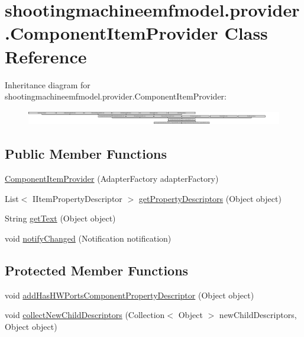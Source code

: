 \hypertarget{classshootingmachineemfmodel_1_1provider_1_1_component_item_provider}{\section{shootingmachineemfmodel.\-provider.\-Component\-Item\-Provider Class Reference}
\label{classshootingmachineemfmodel_1_1provider_1_1_component_item_provider}
}
Inheritance diagram for shootingmachineemfmodel.\-provider.\-Component\-Item\-Provider\-:\begin{figure}[H]
\begin{center}
\leavevmode
\includegraphics[height=0.649840cm]{classshootingmachineemfmodel_1_1provider_1_1_component_item_provider}
\end{center}
\end{figure}
\subsection*{Public Member Functions}
\begin{DoxyCompactItemize}
\item 
\hyperlink{classshootingmachineemfmodel_1_1provider_1_1_component_item_provider_a9955c1ff0c0ebc7d2973e14edfdc672b}{Component\-Item\-Provider} (Adapter\-Factory adapter\-Factory)
\item 
List$<$ I\-Item\-Property\-Descriptor $>$ \hyperlink{classshootingmachineemfmodel_1_1provider_1_1_component_item_provider_a6a12a924c12b5e2605bd6a65855d59de}{get\-Property\-Descriptors} (Object object)
\item 
String \hyperlink{classshootingmachineemfmodel_1_1provider_1_1_component_item_provider_a568ffb9f8ffd9d8acd2b8b381c804b6d}{get\-Text} (Object object)
\item 
void \hyperlink{classshootingmachineemfmodel_1_1provider_1_1_component_item_provider_ab044bb029366a4720defd37a889d43b4}{notify\-Changed} (Notification notification)
\end{DoxyCompactItemize}
\subsection*{Protected Member Functions}
\begin{DoxyCompactItemize}
\item 
void \hyperlink{classshootingmachineemfmodel_1_1provider_1_1_component_item_provider_a4e862c9d80a3fd8c7ca5bba1cb656d4a}{add\-Has\-H\-W\-Ports\-Component\-Property\-Descriptor} (Object object)
\item 
void \hyperlink{classshootingmachineemfmodel_1_1provider_1_1_component_item_provider_a571a2f6d94a5c168bb4e29dc3e29ef64}{collect\-New\-Child\-Descriptors} (Collection$<$ Object $>$ new\-Child\-Descriptors, Object object)
\end{DoxyCompactItemize}


